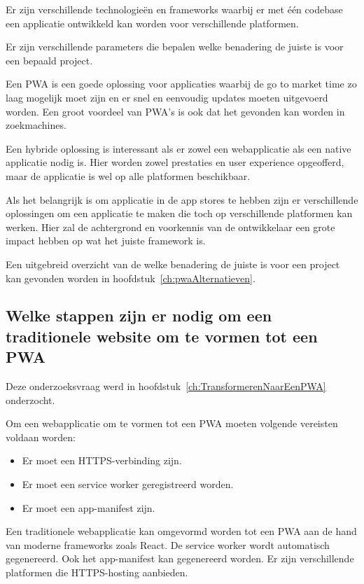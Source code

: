 		Er zijn verschillende technologieën en frameworks waarbij er met één codebase een applicatie ontwikkeld kan worden voor verschillende platformen. 
		
		Er zijn verschillende parameters die bepalen welke benadering de juiste is voor een bepaald project. 
	
		Een PWA is een goede oplossing voor applicaties waarbij de go to market time zo laag mogelijk moet zijn en er snel en eenvoudig updates moeten uitgevoerd worden. Een groot voordeel van PWA's is ook dat het gevonden kan worden in zoekmachines.
		
		Een hybride oplossing is interessant als er zowel een webapplicatie als een native applicatie nodig is. Hier worden zowel prestaties en user experience opgeofferd, maar de applicatie is wel op alle platformen beschikbaar. 
		
		Als het belangrijk is om applicatie in de app stores te hebben zijn er verschillende oplossingen om een applicatie te maken die toch op verschillende platformen kan werken. Hier zal de achtergrond en voorkennis van de ontwikkelaar een grote impact hebben op wat het juiste framework is. 
		
		Een uitgebreid overzicht van de welke benadering de juiste is voor een project kan gevonden worden in hoofdstuk~\ref{ch:pwaAlternatieven}.
	
	\subsection{Welke stappen zijn er nodig om een traditionele website om te vormen tot een PWA}
		
		Deze onderzoeksvraag werd in hoofdstuk~\ref{ch:TransformerenNaarEenPWA} onderzocht. 
		
		Om een webapplicatie om te vormen tot een PWA moeten volgende vereisten voldaan worden:
		\begin{itemize}
			\item	Er moet een HTTPS-verbinding zijn.
			\item	Er moet een service worker geregistreerd worden.
			\item	Er moet een app-manifest zijn.
		\end{itemize}
		
		Een traditionele webapplicatie kan omgevormd worden tot een PWA aan de hand van moderne frameworks zoals React. 
		De service worker wordt automatisch gegenereerd. Ook het app-manifest kan gegenereerd worden. Er zijn verschillende platformen die HTTPS-hosting aanbieden. 
		
